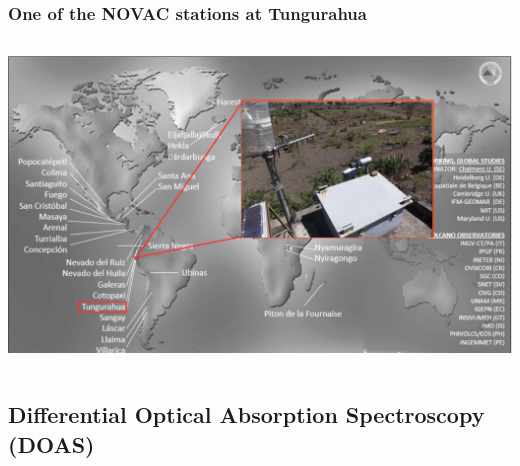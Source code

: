 \documentclass{beamer} %
\begin{document}
	
	\begin{frame}
		\frametitle{\color{mygreen}One of the NOVAC stations at Tungurahua\\%
			\color{mygreen}{\rule{0.8\textwidth}{2pt}}}
		\vspace{-0.1cm}
		\begin{columns}
			\begin{column}{12cm}
				\includegraphics[width=1.\linewidth]{../../Bilder/NOVAC2015SWst}
			\end{column}
		\end{columns}
		
		
	\end{frame}
	
	
	
	
	\subsection{Differential Optical Absorption Spectroscopy (DOAS)}
	
\end{document}
